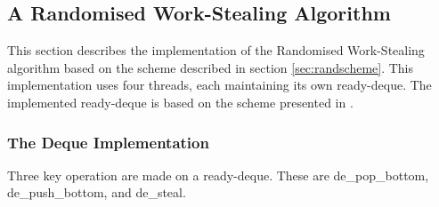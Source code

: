\subsection{A Randomised Work-Stealing Algorithm}


This section describes the implementation of the Randomised Work-Stealing algorithm based on the scheme described in section \ref{sec:randscheme}.
This implementation uses four threads, each maintaining its own \gls{ready-deque}. The implemented \gls{ready-deque} is based on
the scheme presented in \cite{circdeque}.

\subsubsection*{The Deque Implementation}
Three key operation are made on a \gls{ready-deque}. These are de\_pop\_bottom, de\_push\_bottom, and de\_steal.

